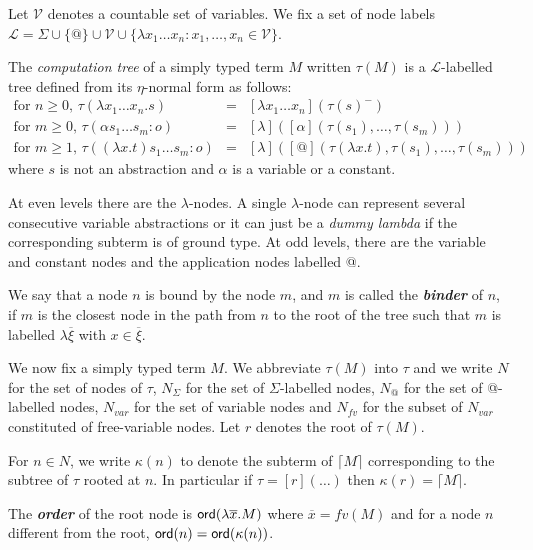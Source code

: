 \documentclass{llncs}
\newcommand\defname[1]{{\bf\em #1}\index{#1}}
\newcommand\aux[1]{\lceil #1\rceil}
\newcommand\ord[1]{{\sf ord}(#1)}
\newcommand\union{\cup}
\begin{document}
\begin{definition}
Let $\mathcal{V}$ denotes a countable set of variables. We fix a set of node labels
$ \mathcal{L} = \Sigma \union \{ @ \} \union \mathcal{V} \union \{ \lambda x_1 \ldots x_n : x_1 ,\ldots, x_n \in \mathcal{V} \}$.


The \emph{computation tree} of a simply typed term $M$ written $\tau(M)$ is
a $\mathcal{L}$-labelled tree defined from its $\eta$-normal form as follows:
\begin{eqnarray*}
  \mbox{for $n\geq0$, } \tau(\lambda x_1 \ldots x_n . s) &=& [\lambda x_1 \ldots x_n](\tau(s)^{-}) \\
  \mbox{for $m\geq0$, } \tau( \alpha s_1 \ldots s_m : o) &=& [ \lambda ]([\alpha](\tau(s_1),\ldots,\tau(s_m)))\\
  \mbox{for $m \geq 1$, } \tau((\lambda x.t) s_1 \ldots s_m :o) &=& [\lambda] ([@](\tau(\lambda x.t),\tau(s_1),\ldots,\tau(s_m)))
\end{eqnarray*}
where $s$ is not an abstraction and $\alpha$ is a variable or a constant.
\end{definition}

At even levels there are the $\lambda$-nodes. A single $\lambda$-node can represent several consecutive variable abstractions or it can just be
a \textsl{dummy lambda} if the corresponding subterm is of ground type.
At odd levels, there are the variable and constant nodes and the application nodes labelled @.

We say that a node $n$ is bound by the node $m$, and $m$ is called the
\defname{binder} of $n$, if $m$ is the closest node in the path from $n$ to
the root of the tree such that $m$ is labelled $\lambda
\overline{\xi}$ with $x\in \overline{\xi}$.


We now fix a simply typed term $M$. We abbreviate $\tau(M)$ into $\tau$ and we write
$N$ for the set of nodes of $\tau$, $N_\Sigma$ for the set of $\Sigma$-labelled nodes,
$N_@$ for the set of @-labelled nodes, $N_{var}$ for the set of variable nodes and
$N_{fv}$ for the subset of $N_{var}$ constituted of free-variable nodes. Let $r$ denotes the root of $\tau(M)$.

For $n \in N$, we write $\kappa(n)$ to denote the subterm of $\aux{M}$
corresponding to the subtree of $\tau$ rooted at $n$.
In particular if $\tau = [r](\ldots)$ then $\kappa(r) = \aux{M}$.

The \defname{order} of the root node is $\ord{\lambda \overline{x} . M}$ where $\overline{x} = fv(M)$ and for
a node $n$ different from the root, $\ord{n} = \ord{\kappa(n)}$.
\end{document}
